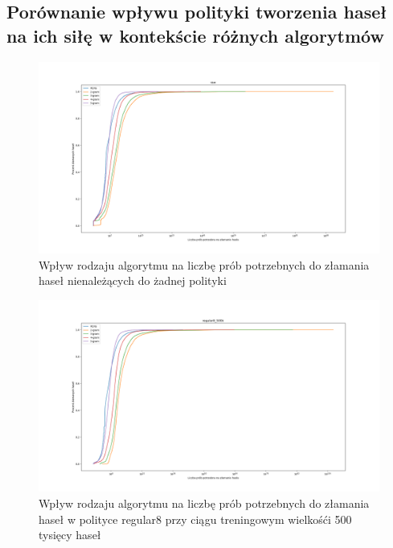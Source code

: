 \documentclass{article}
\begin{document}
	\subsection{Porównanie wpływu polityki tworzenia haseł na ich siłę w kontekście różnych algorytmów}
	\begin{figure}[H]
		\centering
		\includegraphics[width=15cm, keepaspectratio]{raw}
		\caption{Wpływ rodzaju algorytmu na liczbę prób potrzebnych do złamania haseł nienależących do żadnej polityki}
	\end{figure}

	\begin{figure}[H]
		\centering
		\includegraphics[width=15cm, keepaspectratio]{regular8_500k}
		\caption{Wpływ rodzaju algorytmu na liczbę prób potrzebnych do złamania haseł w polityce regular8 przy ciągu treningowym wielkośći 500 tysięcy haseł}
	\end{figure}
\end{document}
